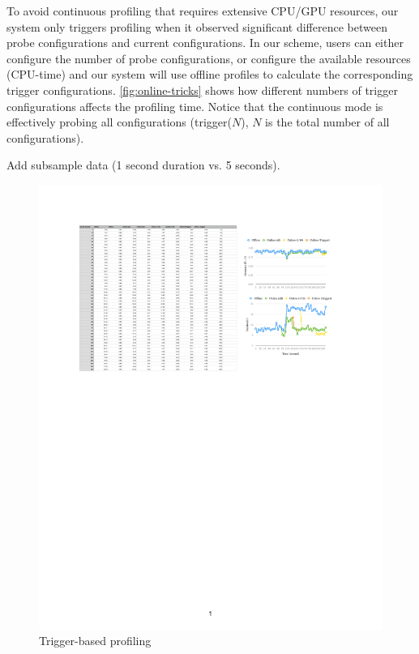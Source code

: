  To avoid continuous profiling that requires
extensive CPU/GPU resources, our system only triggers profiling when it observed
significant difference between probe configurations and current
configurations. In our scheme, users can either configure the number of probe
configurations, or configure the available resources (CPU-time) and our system
will use offline profiles to calculate the corresponding trigger configurations.
\autoref{fig:online-tricks} shows how different numbers of trigger
configurations affects the profiling time. Notice that the continuous mode is
effectively probing all configurations (trigger($N$), $N$ is the total number of
all configurations).

Add subsample data (1 second duration vs. 5 seconds).

\begin{figure}
  \centering
  \includegraphics[width=\columnwidth]{figures/online-tricks.pdf}
  \caption{Trigger-based profiling}
  \label{fig:online-tricks}
\end{figure}

